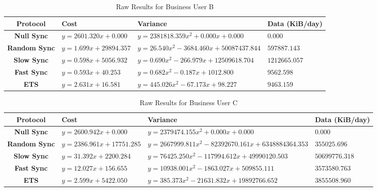 
\begin{table}[htdp]
\begin{center}
\begin{tabular}{|c|l|l|l|}
\hline
\tiny\textbf{Protocol} &  \tiny\textbf{Cost} & \tiny\textbf{Variance} & \tiny\textbf{Data (KiB/day)} \\
\hline
\tiny\textbf{Null Sync} & \tiny$y=2601.320x+0.000$ & \tiny$y=2381818.359x^2+0.000x+0.000$ & \tiny$0.000$ \\
\hline
\tiny\textbf{Random Sync} & \tiny$y=1.699x+29894.357$ & \tiny$y=26.540x^2-3684.460x+50087437.844$ & \tiny$597887.143$ \\
\hline
\tiny\textbf{Slow Sync} & \tiny$y=0.598x+5056.932$ & \tiny$y=0.690x^2-266.979x+12509618.704$ & \tiny$1212665.057$ \\
\hline
\tiny\textbf{Fast Sync} & \tiny$y=0.593x+40.253$ & \tiny$y=0.682x^2-0.187x+1012.800$ & \tiny$9562.598$ \\
\hline
\tiny\textbf{ETS} & \tiny$y=2.631x+16.581$ & \tiny$y=445.026x^2-67.173x+98.227$ & \tiny$9463.159$ \\
\hline
\end{tabular}
\end{center}
\caption{Raw Results for Business User B}
\label{business_b:rawresults}
\end{table}


\begin{table}[htdp]
\begin{center}
\begin{tabular}{|c|l|l|l|}
\hline
\tiny\textbf{Protocol} &  \tiny\textbf{Cost} & \tiny\textbf{Variance} & \tiny\textbf{Data (KiB/day)} \\
\hline
\tiny\textbf{Null Sync} & \tiny$y=2600.942x+0.000$ & \tiny$y=2379474.155x^2+0.000x+0.000$ & \tiny$0.000$ \\
\hline
\tiny\textbf{Random Sync} & \tiny$y=2386.961x+17751.285$ & \tiny$y=2667999.811x^2-82392670.161x+6348884364.353$ & \tiny$355025.696$ \\
\hline
\tiny\textbf{Slow Sync} & \tiny$y=31.392x+2200.284$ & \tiny$y=76425.250x^2-117994.612x+49990120.503$ & \tiny$50699776.318$ \\
\hline
\tiny\textbf{Fast Sync} & \tiny$y=12.027x+156.655$ & \tiny$y=10938.001x^2-1863.027x+509855.111$ & \tiny$3573580.763$ \\
\hline
\tiny\textbf{ETS} & \tiny$y=2.599x+5422.050$ & \tiny$y=385.373x^2-21631.832x+19892766.652$ & \tiny$3855508.960$ \\
\hline
\end{tabular}
\end{center}
\caption{Raw Results for Business User C}
\label{business_c:rawresults}
\end{table}

